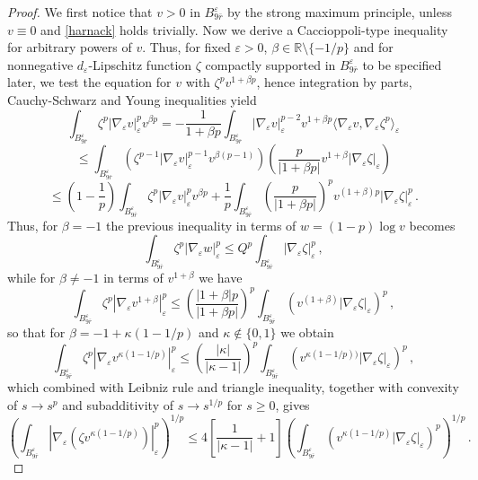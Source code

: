 \documentclass[10pt]{amsart}
\numberwithin{equation}{section}
\theoremstyle{definition}
\begin{document}
\begin{proof}
 We first notice that $v>0$ in $B^\varepsilon_{ 9\bar{r}}$ by the strong maximum principle, unless $v \equiv 0$ and \eqref{harnack} holds trivially.
Now we derive a Caccioppoli-type inequality for arbitrary powers of $v$. Thus, for fixed $\varepsilon>0$, $\beta \in \mathbb{R}\setminus \{ -1/p\}$ and for nonnegative $d_\varepsilon$-Lipschitz function $\zeta$ compactly supported in $B^\varepsilon_{ 9\bar{r}}$ to be specified later, we test the equation for $v$ with $\zeta^p v^{1+\beta p}$, hence integration by parts, Cauchy-Schwarz and Young inequalities yield
\[ \int_{B^\varepsilon_{9 \bar{r}}}  \zeta^p | \nabla_\varepsilon v |_\varepsilon^p v^{\beta p} = -\frac{1}{1+\beta p}\int_{B^\varepsilon_{ 9\bar{r}}} | \nabla_\varepsilon v |_\varepsilon^{p-2} v^{1+\beta p} \langle \nabla_\varepsilon v, \nabla_\varepsilon  \zeta^p \rangle_{\varepsilon}  \] \[ \leq  \int_{B^\varepsilon_{ 9\bar{r}}} \left( \zeta^{p-1}| \nabla_\varepsilon v |_\varepsilon^{p-1} v^{\beta (p-1)} \right)  \left(  \frac{p}{|1+\beta p|}v^{1+\beta }  |\nabla_\varepsilon \zeta|_\varepsilon \right) \] 
\[ \leq \left( 1-\frac1p\right) \int_{B^\varepsilon_{ 9\bar{r}}}  \zeta^p | \nabla_\varepsilon v |_\varepsilon^p v^{\beta p}+ \frac1p\int_{B^\varepsilon_{ 9\bar{r}}}   \left(  \frac{p}{|1+\beta p|} \right)^p v^{(1+\beta)p }  |\nabla_\varepsilon \zeta|^p_\varepsilon \, .\]
Thus, for $\beta=-1$ the previous inequality in terms of $w=(1-p)\log v$ becomes
\begin{equation}
\label{caccioppoli-garofalo-1}
\int_{B^\varepsilon_{ 9\bar{r}}}  \zeta^p | \nabla_\varepsilon w |_\varepsilon^p   \leq  Q^p \int_{B^\varepsilon_{ 9\bar{r}}}    |\nabla_\varepsilon \zeta|^p_\varepsilon \, ,
\end{equation}
while for $\beta \neq -1$ in terms of $v^{1+\beta}$ we have
\begin{equation}
\label{caccioppoli-garofalo-1.5}
	\int_{B^\varepsilon_{ 9\bar{r}}}  \zeta^p \left| \nabla_\varepsilon v^{1+\beta} \right|_\varepsilon^p  \leq  \left(  \frac{|1+\beta|p}{|1+\beta p|} \right)^p\int_{B^\varepsilon_{9 \bar{r}}}   \left( v^{(1+\beta) }  |\nabla_\varepsilon \zeta|_\varepsilon \right)^p \, ,
\end{equation}
so that for $\beta=-1+\kappa (1-1/p)$ and $\kappa \not \in \{0, 1\}$ we obtain
\[
\int_{B^\varepsilon_{ 9\bar{r}}}  \zeta^p \left| \nabla_\varepsilon v^{\kappa (1-1/p)} \right|_\varepsilon^p  \leq  \left(  \frac{|\kappa |}{|\kappa  -1|} \right)^p\int_{B^\varepsilon_{9 \bar{r}}}   \left( v^{\kappa (1-1/p)) }  |\nabla_\varepsilon \zeta|_\varepsilon \right)^p \, ,
\]
which combined with Leibniz rule and triangle inequality, together with convexity of $s \to s^p$ and subadditivity of $s \to s^{1/p}$ for $s \geq 0$, gives 
\begin{equation}
\label{caccioppoli-garofalo-2}
\left(\int_{B^\varepsilon_{9 \bar{r}}}   \left| \nabla_\varepsilon \left( \zeta v^{\kappa (1-1/p)}\right) \right|_\varepsilon^p \right)^{1/p} \leq   4 \left[  \frac{1}{|\kappa -1|} +1 \right] \left( \int_{B^\varepsilon_{ 9\bar{r}}}   \left( v^{\kappa (1-1/p) }  |\nabla_\varepsilon \zeta|_\varepsilon \right)^p \right)^{1/p}\, .
\end{equation} 


\end{proof}
\end{document}

